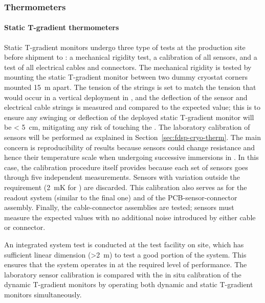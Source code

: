 \subsubsection{Thermometers}
\label{sec:fdgen-slow-cryo-qc-th}

\paragraph{Static T-gradient thermometers}
\label{sec:fdgen-slow-cryo-qc-thst}

Static T-gradient monitors undergo three type of tests at the production site before %
shipment to \surf: a mechanical rigidity test, a calibration of all sensors, and a test of all electrical cables and connectors.
The mechanical rigidity is tested by mounting the static T-gradient monitor between two dummy cryostat corners mounted \SI{15}{m} apart. The tension of the strings is set to match the tension that would occur in a vertical deployment in \lar, and the deflection of the sensor and electrical cable strings is measured and compared to the expected value; this is to ensure any swinging or deflection of the deployed static T-gradient monitor will be < \SI{5}{cm}, mitigating any risk of touching the .
The laboratory calibration of sensors will be performed 
as explained in Section~\ref{sec:fdsp-cryo-therm}. The main concern is reproducibility of results because sensors could change resistance and hence their temperature scale when undergoing successive immersions in \lar. In this case, the calibration procedure itself provides  because each set of sensors goes through five independent measurements. Sensors with \rms variation outside the requirement (\SI{2}{mK} for ) are discarded. This calibration also serves as  for the readout system (similar to the final one) and of the PCB-sensor-connector assembly.
Finally, the cable-connector assemblies are tested; sensors must measure the expected values with no additional noise introduced by either cable or connector. 

An integrated system test is conducted at the \lar test facility on site, which has sufficient linear dimension (>\SI{2}{m}) to test a good portion of the system. This %
ensures that  the system
operates in \lar at the required level of performance.
The laboratory sensor calibration %
is compared with the in situ calibration
of the dynamic T-gradient monitors by operating both dynamic and static T-gradient monitors simultaneously.   

